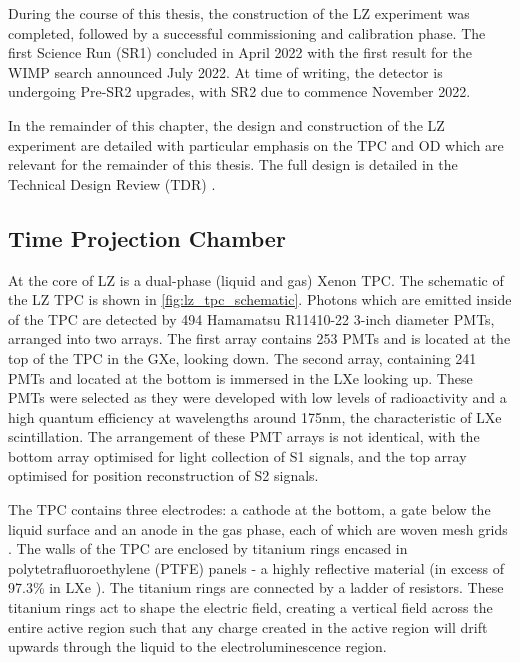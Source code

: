 \par
During the course of this thesis, the construction of the LZ experiment was completed, followed by a successful commissioning and calibration phase.
The first Science Run (SR1) concluded in April 2022 with the first result for the WIMP search announced July 2022.
At time of writing, the detector is undergoing Pre-SR2 upgrades, with SR2 due to commence November 2022.

\par
In the remainder of this chapter, the design and construction of the LZ experiment are detailed with particular emphasis on the TPC and OD which are relevant for the remainder of this thesis. 
The full design is detailed in the Technical Design Review (TDR) \cite{LZ_TechnicalDesignReview_ref}.

\subsection{Time Projection Chamber}
\label{sec:lz_tpc}
\par
At the core of LZ is a dual-phase (liquid and gas) Xenon TPC.
The schematic of the LZ TPC is shown in \autoref{fig:lz_tpc_schematic}.
Photons which are emitted inside of the TPC are detected by 494 Hamamatsu R11410-22 3-inch diameter PMTs, arranged into two arrays.
The first array contains 253 PMTs and is located at the top of the TPC in the GXe, looking down.
The second array, containing 241 PMTs and located at the bottom is immersed in the LXe looking up.
These PMTs were selected as they were developed with low levels of radioactivity and a high quantum efficiency at wavelengths around 175nm, the characteristic of LXe scintillation.
The arrangement of these PMT arrays is not identical, with the bottom array optimised for light collection of S1 signals, and the top array optimised for position reconstruction of S2 signals.
\par
The TPC contains three electrodes: a cathode at the bottom, a gate below the liquid surface and an anode in the gas phase, each of which are woven mesh grids \cite{lz_grids_ref}.
The walls of the TPC are enclosed by titanium rings encased in polytetrafluoroethylene (PTFE) panels - a highly reflective material (in excess of 97.3\% in LXe \cite{ptfe_lxe_reflectivity_ref}).
The titanium rings are connected by a ladder of resistors.
These titanium rings act to shape the electric field, creating a vertical field across the entire active region such that any charge created in the active region will drift upwards through the liquid to the electroluminescence region.
